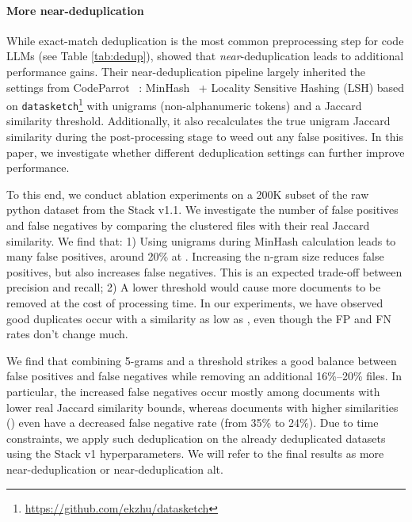 \documentclass[10pt]{article} \usepackage{iclr2023_conference,times}
\begin{document}
\paragraph{More near-deduplication} While exact-match deduplication is the most common preprocessing step for code LLMs (see Table \ref{tab:dedup}), \citet{Kocetkov2022TheStack} showed that \emph{near}-deduplication leads to additional performance gains. Their near-deduplication pipeline largely inherited the settings from CodeParrot ~\citep{Tunstall2022-nw}: MinHash~\citep{broder2000identifying} + Locality Sensitive Hashing (LSH) based on \texttt{datasketch}\footnote{\url{https://github.com/ekzhu/datasketch}} with unigrams (non-alphanumeric tokens) and a  Jaccard similarity threshold. Additionally, it also recalculates the true unigram Jaccard similarity during the post-processing stage to weed out any false positives. In this paper, we investigate whether different deduplication settings can further improve performance.

To this end, we conduct ablation experiments on a 200K subset of the raw python dataset from the Stack v1.1. We investigate the number of false positives and false negatives by comparing the clustered files with their real Jaccard similarity. We find that: 1) Using unigrams during MinHash calculation leads to many false positives, around 20\% at . Increasing the n-gram size reduces false positives, but also increases false negatives. This is an expected trade-off between precision and recall; 2) A lower threshold would cause more documents to be removed at the cost of processing time. In our experiments, we have observed good duplicates occur with a similarity as low as , even though the FP and FN rates don't change much.

We find that combining 5-grams and a  threshold strikes a good balance between false positives and false negatives while removing an additional 16\%--20\% files. In particular, the increased false negatives occur mostly among documents with lower real Jaccard similarity bounds, whereas documents with higher similarities () even have a decreased false negative rate (from 35\% to 24\%). Due to time constraints, we apply such deduplication on the already deduplicated datasets using the Stack v1 hyperparameters. We will refer to the final results as more near-deduplication or near-deduplication alt. 
\end{document}
